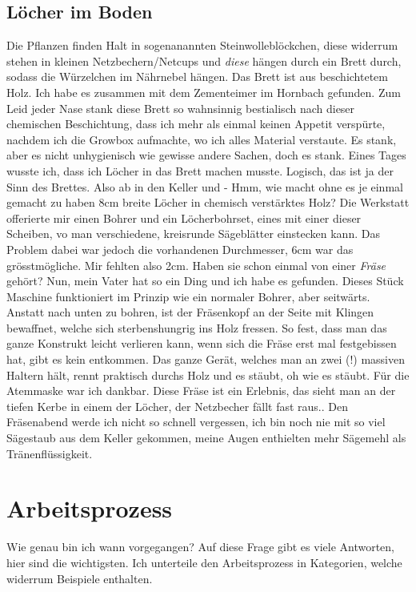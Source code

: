 \documentclass[12pt,titlepage,a4paper]{article}
\begin{document}
\subsection{Löcher im Boden}
Die Pflanzen finden Halt in sogenanannten Steinwolleblöckchen, diese widerrum stehen in kleinen Netzbechern/Netcups und \textit{diese} hängen durch ein Brett durch, sodass die Würzelchen im Nährnebel hängen. Das Brett ist aus beschichtetem Holz. Ich habe es zusammen mit dem Zementeimer im Hornbach gefunden. Zum Leid jeder Nase stank diese Brett so wahnsinnig bestialisch nach dieser chemischen Beschichtung, dass ich mehr als einmal keinen Appetit verspürte, nachdem ich die Growbox aufmachte, wo ich alles Material verstaute. Es stank, aber es nicht unhygienisch wie gewisse andere Sachen, doch es stank. Eines Tages wusste ich, dass ich Löcher in das Brett machen musste. Logisch, das ist ja der Sinn des Brettes. Also ab in den Keller und - Hmm, wie macht ohne es je einmal gemacht zu haben 8cm breite Löcher in chemisch verstärktes Holz? Die Werkstatt offerierte mir einen Bohrer und ein Löcherbohrset, eines mit einer dieser Scheiben, vo man verschiedene, kreisrunde Sägeblätter einstecken kann. Das Problem dabei war jedoch die vorhandenen Durchmesser, 6cm war das grösstmögliche. Mir fehlten also 2cm. Haben sie schon einmal von einer \textit{Fräse} gehört? Nun, mein Vater hat so ein Ding und ich habe es gefunden. Dieses Stück Maschine funktioniert im Prinzip wie ein normaler Bohrer, aber seitwärts. Anstatt nach unten zu bohren, ist der Fräsenkopf an der Seite mit Klingen bewaffnet, welche sich sterbenshungrig ins Holz fressen. So fest, dass man das ganze Konstrukt leicht verlieren kann, wenn sich die Fräse erst mal festgebissen hat, gibt es kein entkommen. Das ganze Gerät, welches man an zwei (!) massiven Haltern hält, rennt praktisch durchs Holz und es stäubt, oh wie es stäubt. Für die Atemmaske war ich dankbar. Diese Fräse ist ein Erlebnis, das sieht man an der tiefen Kerbe in einem der Löcher, der Netzbecher fällt fast raus.. Den Fräsenabend werde ich nicht so schnell vergessen, ich bin noch nie mit so viel Sägestaub aus dem Keller gekommen, meine Augen enthielten mehr Sägemehl als Tränenflüssigkeit.
\newpage

\section{Arbeitsprozess}
Wie genau bin ich wann vorgegangen? Auf diese Frage gibt es viele Antworten, hier sind die wichtigsten. Ich unterteile den Arbeitsprozess in Kategorien, welche widerrum Beispiele enthalten.
\end{document}
